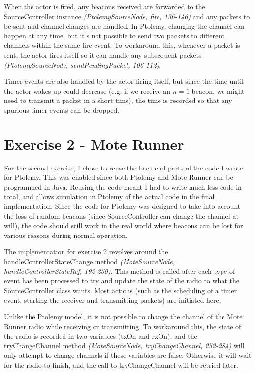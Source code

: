\documentclass[a4paper,12pt,draft,DIV=calc]{scrartcl}
\newcommand{\coderef}[3]{\emph{(#1, #2, #3)}}
\begin{document}
When the actor is fired, any beacons received are forwarded to the
SourceController instance \coderef{PtolemySourceNode}{fire}{136-146} and any
packets to be sent and channel changes are handled. In Ptolemy, changing the
channel can happen at any time, but it's not possible to send two packets to
different channels within the same fire event. To workaround this, whenever a
packet is sent, the actor fires itself so it can handle any subsequent packets
\coderef{PtolemySourceNode}{sendPendingPacket}{106-112}.

Timer events are also handled by the actor firing itself, but since the time
until the actor wakes up could decrease (e.g. if we receive an $n = 1$ beacon,
we might need to transmit a packet in a short time), the time is recorded so
that any spurious timer events can be dropped.

\section{Exercise 2 - Mote Runner}
For the second exercise, I chose to reuse the back end parts of the code I wrote
for Ptolemy. This was enabled since both Ptolemy and Mote Runner can be
programmed in Java. Reusing the code meant I had to write much less code in
total, and allows simulation in Ptolemy of the actual code in the final
implementation. Since the code for Ptolemy was designed to take into account the
loss of random beacons (since SourceController can change the channel at will),
the code should still work in the real world where beacons can be lost for
various reasons during normal operation.

The implementation for exercise 2 revolves around the
handleControllerStateChange method
\coderef{MoteSourceNode}{handleControllerStateRef}{192-250}. This method is
called after each type of event has been processed to try and update the state
of the radio to what the SourceController class wants. Most actions (such as the
scheduling of a timer event, starting the receiver and transmitting packets) are
initiated here.

Unlike the Ptolemy model, it is not possible to change the channel of the Mote
Runner radio while receiving or transmitting. To workaround this, the state of
the radio is recorded in two variables (txOn and rxOn), and the tryChangeChannel
method \coderef{MoteSourceNode}{tryChangeChannel}{252-284} will only attempt to
change channels if these variables are false. Otherwise it will wait for the
radio to finish, and the call to tryChangeChannel will be retried later.
\end{document}
